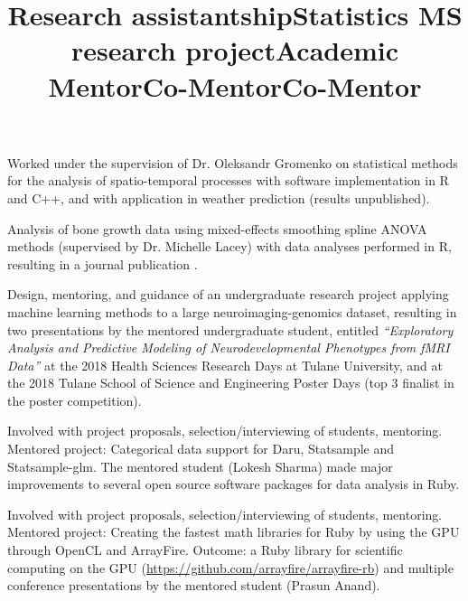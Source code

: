 \documentclass[overlapped, line, 10pt]{res} %
\begin{document}
\begin{resume}
\title{Research assistantship}
\begin{position}
  Worked under the supervision of Dr. Oleksandr Gromenko on statistical methods for the analysis of spatio-temporal processes with software implementation in R and C++, and with application in weather prediction (results unpublished).
\end{position}

\title{Statistics MS research project}
\begin{position}
  Analysis of bone growth data using mixed-effects smoothing spline ANOVA methods (supervised by Dr. Michelle Lacey) with data analyses performed in R, resulting in a journal publication \cite{sammarco2015}.
\end{position}

\title{Academic Mentor}
\begin{position}
  Design, mentoring, and guidance of an undergraduate research project applying machine learning methods to a large neuroimaging-genomics dataset, resulting in two presentations by the mentored undergraduate student, entitled \emph{``Exploratory Analysis and Predictive Modeling of Neurodevelopmental Phenotypes from fMRI Data''} at the 2018 Health Sciences Research Days at Tulane University, and at the 2018 Tulane School of Science and Engineering Poster Days (top 3 finalist in the poster competition).
\end{position}

\title{Co-Mentor}
\begin{position}
  Involved with project proposals, selection/interviewing of students, mentoring. Mentored project: Categorical data support for Daru, Statsample and Statsample-glm. The mentored student (Lokesh Sharma) made major improvements to several open source software packages for data analysis in Ruby.
\end{position}

\title{Co-Mentor}
\begin{position}
  Involved with project proposals, selection/interviewing of students, mentoring. Mentored project: Creating the fastest math libraries for Ruby by using the GPU through OpenCL and ArrayFire. Outcome: a Ruby library for scientific computing on the GPU (\url{https://github.com/arrayfire/arrayfire-rb}) and multiple conference presentations by the mentored student (Prasun Anand).
\end{position}


\end{resume}
\end{document}
